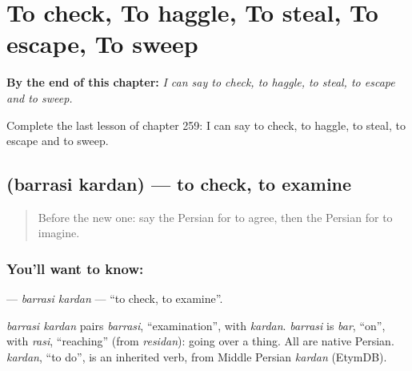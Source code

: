 
\chapter{To check, To haggle, To steal, To escape, To sweep}
\label{ch:fa-to-check-to-haggle-to-steal-to-escape-to-sweep}

\begin{chapteropening}
\textbf{By the end of this chapter:} \emph{I can say to check, to haggle, to steal, to escape and to sweep.}

Complete the last lesson of chapter 259: I can say to check, to haggle, to steal, to escape and to sweep.
\end{chapteropening}

\section[\texorpdfstring{\fa{بررسی} \fa{کردن} (barrasi kardan)}{بررسی کردن (barrasi kardan)}]{  (barrasi kardan) — to check, to examine}

\label{lesson:FA-C259-barrasi-kardan}



\begin{quote}
Before the new one: say the Persian for to agree, then the Persian for to imagine.
\end{quote}

\subsection*{You'll want to know:  }
\textbf{ } — \emph{barrasi kardan} — \textquotedblleft{}to check, to examine\textquotedblright{}.

\begin{cousinweb}
\emph{barrasi kardan} pairs \emph{barrasi}, \textquotedblleft{}examination\textquotedblright{}, with \emph{kardan}. \emph{barrasi} is \emph{bar}, \textquotedblleft{}on\textquotedblright{}, with \emph{rasi}, \textquotedblleft{}reaching\textquotedblright{} (from \emph{residan}): going over a thing. All are native Persian. \emph{kardan}, \textquotedblleft{}to do\textquotedblright{}, is an inherited verb, from Middle Persian \emph{kardan} (EtymDB).
\end{cousinweb}

